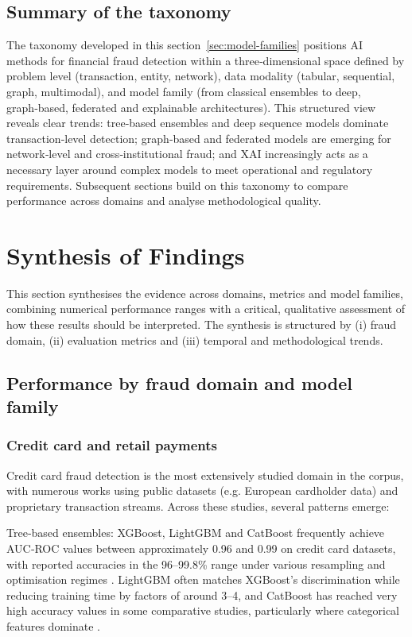 \documentclass[a4paper,fleqn]{cas-dc}
\begin{document}
\subsection{Summary of the taxonomy}
The taxonomy developed in this section~\ref{sec:model-families} positions AI methods for financial fraud detection within a three‑dimensional space defined by problem level (transaction, entity, network), data modality (tabular, sequential, graph, multimodal), and model family (from classical ensembles to deep, graph‑based, federated and explainable architectures). 
This structured view reveals clear trends: tree‑based ensembles and deep sequence models dominate transaction‑level detection; graph‑based and federated models are emerging for network‑level and cross‑institutional fraud; and XAI increasingly acts as a necessary layer around complex models to meet operational and regulatory requirements. 
Subsequent sections build on this taxonomy to compare performance across domains and analyse methodological quality.

\section{Synthesis of Findings}
This section synthesises the evidence across domains, metrics and model families, combining numerical performance ranges with a critical, qualitative assessment of how these results should be interpreted. 
The synthesis is structured by (i) fraud domain, (ii) evaluation metrics and (iii) temporal and methodological trends.

\subsection{Performance by fraud domain and model family}
\subsubsection{Credit card and retail payments}
Credit card fraud detection is the most extensively studied domain in the corpus, with numerous works using public datasets (e.g. European cardholder data) and proprietary transaction streams. 
Across these studies, several patterns emerge:

Tree‑based ensembles: XGBoost, LightGBM and CatBoost frequently achieve AUC‑ROC values between approximately 0.96 and 0.99 on credit card datasets, with reported accuracies in the 96–99.8\% range under various resampling and optimisation regimes \cite{ileberi_hybrid_2024}. 
LightGBM often matches XGBoost’s discrimination while reducing training time by factors of around 3–4, and CatBoost has reached very high accuracy values in some comparative studies, particularly where categorical features dominate \cite{hashemi_fraud_2023}.
\end{document}
